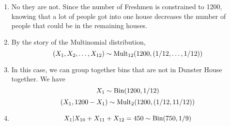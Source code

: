 \documentclass[11.5pt]{article}
\begin{document}
\begin{solution}{3.5}
\vspace{-5mm}
\begin{enumerate}
\item No they are not. Since the number of Freshmen is constrained to 1200, knowing that a lot of people got into one house decreases the number of people that could be in the remaining houses.
\item By the story of the Multinomial distribution,
$$(X_1, X_2, \ldots, X_{12}) \sim \Mult_{12}\paren{1200, \paren{1/12, \dots, 1/12}}$$
\item In this case, we can group together bins that are not in Dunster House together. We have
$$X_1 \sim \Bin\paren{1200, 1/12}$$
$$(X_1, 1200 - X_1) \sim \Mult_2\paren{1200, (1/12, 11/12)}$$
\item
$$X_1 | X_{10} + X_{11} + X_{12} = 450 \sim \Bin\paren{750, 1/9}$$
\end{enumerate}
\end{solution}
\end{document}
